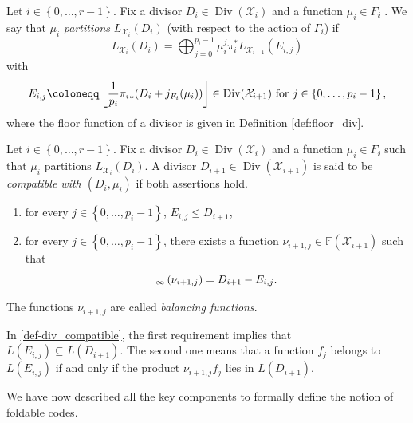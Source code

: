 \documentclass[a4paper,USenglish,autoref]{lipics-v2021}
\newcommand\F{\mathbb{F}}
\newcommand\floor[1]{\left\lfloor #1 \right\rfloor}
\newcommand\poles[1]{\div_\infty\left( #1 \right)}
\DeclareMathOperator{\Div}{Div}
\let\div\relax\DeclareMathOperator{\div}{div}
\newcommand{\set}[1]{\left\{#1\right\}}
\newcommand{\range}[1]{\set{0,\dots,#1-1}}
\newcommand\calX{\mathcal{X}}
\newcommand\mydef{\coloneqq}
\begin{document}
\begin{definition}\label{def:mu-decomp}
	Let $i \in \range{r}$. Fix a divisor $D_i \in \Div(\calX_i)$ and a function $\mu_i \in F_i$ . We say that $\mu_i$ \emph{partitions} $L_{\calX_i}(D_i)$ (with respect to the action of $\Gamma_i$) if
	\begin{equation}\label{eq:decomposition}
		L_{\calX_i}(D_i)= \bigoplus_{j=0}^{p_i-1} \mu_i^j \pi_i^* L_{\calX_{i+1}}(E_{i,j})
	\end{equation}
	with
	\begin{equation}\label{eq:def-Eij}
		E_{i,j}\mydef \floor{\frac{1}{p_i}{\pi_i}_*( D_i + j\div_{F_i}(\mu_i))} \in \Div(\calX_{i+1}) \text{ for } j \in \range{p_i},
	\end{equation}
	where the floor function of a divisor is given in Definition \ref{def:floor_div}.
\end{definition}

\begin{definition}\label{def-div_compatible}
	Let $i \in \range{r}$. Fix a divisor $D_i \in \Div(\calX_i)$ and a function $\mu_i \in F_i$ such that $\mu_i$ partitions $L_{\calX_i}(D_i)$. A divisor $D_{i+1} \in \Div(\calX_{i+1})$ is said to be \emph{compatible with $(D_i,\mu_i)$} if both assertions hold.
	\begin{enumerate}
		\item for every $j \in \range{p_i}$, $E_{i,j} \leq D_{i+1}$,
		\item  for every $j \in \range{p_i}$, there exists a function $\nu_{i+1,j}\in \F(\calX_{i+1})$ such that
		\begin{equation}\label{eq:def-nu_i,j}
			\poles{\nu_{i+1,j}}=D_{i+1} - E_{i,j}. 
		\end{equation}
	\end{enumerate}
	The functions $\nu_{i+1,j}$ are called \emph{balancing functions}.
\end{definition}


In \autoref{def-div_compatible}, the first requirement implies that $L(E_{i,j}) \subseteq L(D_{i+1})$. The second one means that a function $f_j$ belongs to $L(E_{i,j})$ if and only if the product $\nu_{i+1, j}f_j$ lies in $L(D_{i+1})$.

We have now described all the key components to formally define the notion of foldable codes.
\end{document}
